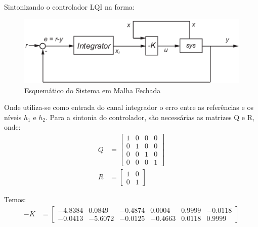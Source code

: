 \documentclass[11pt,]{article}
\begin{document}
        Sintonizando o controlador LQI na forma:
         \begin{figure}[H]
         	\centering
         	\includegraphics[scale=1]{lqi1.png}
         	\caption{Esquemático do Sistema em Malha Fechada}
         	\label{EsqLQI}
         \end{figure}
        Onde utiliza-se como entrada do canal integrador o erro entre as referências e os níveis $h_1$ e $h_2$.
        Para a sintonia do controlador, são necessárias as matrizes Q e R, onde:
        \begin{align*}
        	Q &= 
        	\begin{bmatrix}
        		1 & 0 & 0 & 0 \\
        		0 & 1 & 0 & 0 \\
        		0 & 0 & 1 & 0 \\
        		0 & 0 & 0 & 1
        	\end{bmatrix} \\
			R &= 
        	\begin{bmatrix}
	        	1 & 0 \\
	        	0 & 1
        	\end{bmatrix}
        \end{align*}
        
        Temos:
        \begin{align*}
	        -K &= 
	        \begin{bmatrix}
	        -4.8384 & 0.0849 & -0.4874 & 0.0004 & 0.9999 & -0.0118\\
		    -0.0413 & -5.6072 & -0.0125 & -0.4663 & 0.0118 & 0.9999
	        \end{bmatrix}
        \end{align*}
        
\end{document}

